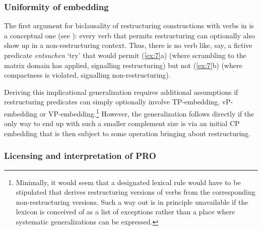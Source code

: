 \documentclass[output=paper]{langsci/langscibook}
\begin{document}
\subsubsection{\label{b1}Uniformity of embedding}

The first argument for biclausality of restructuring constructions with 
verbs in  is a conceptual one (see
\citealt{Koster:87,Stechow&Sternefeld:88}): every  verb that permits
restructuring can optionally also show up in a non-restructuring context. Thus,
there is no  verb like, say, a fictive predicate {\itshape entsuchen}
\enquote*{try} that would permit (\ref{ex:7}a) (where scrambling to the matrix
domain has applied, signalling restructuring) but not (\ref{ex:7}b) (where
compactness is violated, signalling non-restructuring).

\ea\label{ex:7} 
    \z
\z

Deriving this implicational generalization requires additional assumptions if
restructuring predicates can simply optionally involve TP-embedding,
vP-em\-bed\-ding or VP-embedding.\footnote{Minimally, it would seem that a
    designated lexical rule would have to be stipulated that derives
    restructuring versions of verbs from the corresponding non-restructuring
    versions. Such a way out is in principle unavailable if the lexicon is
    conceived of as a list of exceptions rather than a place where systematic
generalizations can be expressed.} However, the generalization follows directly
if the only way to end up with such a smaller complement size is via an initial
CP embedding that is then subject to some operation bringing about
restructuring.

\subsubsection{\label{b2}Licensing and interpretation of PRO}
\end{document}
